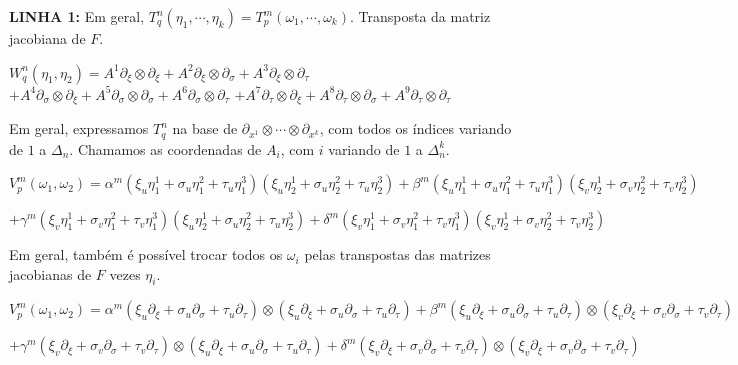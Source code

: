 \documentclass[10pt,a4paper]{article}
\begin{document}
		\textbf{LINHA 1:} Em geral, $T_q^n(\eta_1,\cdots,\eta_k) = T_p^m(\omega_1, \cdots, \omega_k)$. Transposta da matriz jacobiana de $F$.

		\vspace{3mm}

		$W_q^n(\eta_1, \eta_2) = A^1 \partial_\xi \otimes \partial_\xi + A^2 \partial_\xi \otimes \partial_\sigma + A^3 \partial_\xi \otimes \partial_\tau $
		$+ A^4 \partial_\sigma \otimes \partial_\xi + A^5 \partial_\sigma \otimes \partial_\sigma + A^6 \partial_\sigma \otimes \partial_\tau $
		$+ A^7 \partial_\tau \otimes \partial_\xi + A^8 \partial_\tau \otimes \partial_\sigma + A^9 \partial_\tau \otimes \partial_\tau $

		Em geral, expressamos $T_q^n$ na base de $\partial_{x^1} \otimes \cdots \otimes \partial_{x^k}$, com todos os \'indices variando de $1$ a $\Delta_n$. Chamamos as coordenadas de $A_i$, com $i$ variando de $1$ a $\Delta_n^k$.

		\vspace{3mm}

		$V_p^m(\omega_1, \omega_2) = \alpha^m (\xi_u \eta_1^1 + \sigma_u \eta_1^2 + \tau_u \eta_1^3) (\xi_u \eta_2^1 + \sigma_u \eta_2^2 + \tau_u \eta_2^3) + \beta^m (\xi_u \eta_1^1 + \sigma_u \eta_1^2 + \tau_u \eta_1^3) (\xi_v \eta_2^1 + \sigma_v \eta_2^2 + \tau_v \eta_2^3)$

		$+ \gamma^m (\xi_v \eta_1^1 + \sigma_v \eta_1^2 + \tau_v \eta_1^3) (\xi_u \eta_2^1 + \sigma_u \eta_2^2 + \tau_u \eta_2^3) + \delta^m (\xi_v \eta_1^1 + \sigma_v \eta_1^2 + \tau_v \eta_1^3) (\xi_v \eta_2^1 + \sigma_v \eta_2^2 + \tau_v \eta_2^3)$

		\vspace{3mm}

		Em geral, tamb\'em \'e poss\'ivel trocar todos os $\omega_i$ pelas transpostas das matrizes jacobianas de $F$ vezes $\eta_i$.

		\vspace{3mm}

		$V_p^m(\omega_1, \omega_2) = \alpha^m (\xi_u \partial_\xi + \sigma_u \partial_\sigma + \tau_u \partial_\tau) \otimes (\xi_u \partial_\xi + \sigma_u \partial_\sigma + \tau_u \partial_\tau) + \beta^m (\xi_u \partial_\xi + \sigma_u \partial_\sigma + \tau_u \partial_\tau) \otimes (\xi_v \partial_\xi + \sigma_v \partial_\sigma + \tau_v \partial_\tau)$

		$+ \gamma^m (\xi_v \partial_\xi + \sigma_v \partial_\sigma + \tau_v \partial_\tau) \otimes (\xi_u \partial_\xi + \sigma_u \partial_\sigma + \tau_u \partial_\tau) + \delta^m (\xi_v \partial_\xi + \sigma_v \partial_\sigma + \tau_v \partial_\tau) \otimes (\xi_v \partial_\xi + \sigma_v \partial_\sigma + \tau_v \partial_\tau)$
\end{document}
